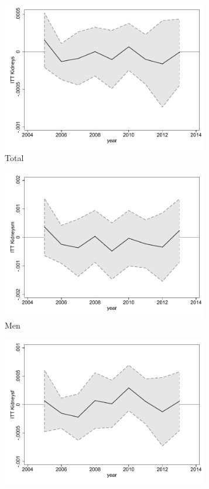 \documentclass[a4paper ]{article}
\begin{document}
\begin{figure}[h!]
	\centering
	\begin{subfigure}[t]{0.31\textwidth}
		\centering
		\includegraphics[width=0.99\textwidth]{R1_LC_Kidneys}
		\caption{Total}		
	\end{subfigure}
	\begin{subfigure}[t]{0.31\textwidth}
		\centering
		\includegraphics[width=0.99\textwidth]{R1_LC_Kidneysm}
		\caption{Men}		
	\end{subfigure}
	\quad
	\begin{subfigure}[t]{0.31\textwidth}
		\centering
		\includegraphics[width=0.99\textwidth]{R1_LC_Kidneysf}

\end{subfigure}
\end{figure}
\end{document}
